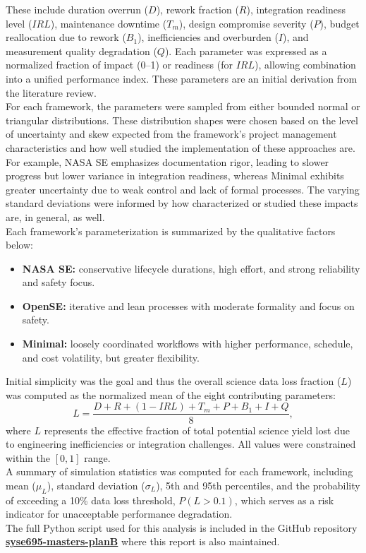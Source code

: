 These include duration overrun ($D$), rework fraction ($R$), integration readiness level ($IRL$), maintenance downtime ($T_m$), design compromise severity ($P$), budget reallocation due to rework ($B_1$), inefficiencies and overburden ($I$), and measurement quality degradation ($Q$). 
Each parameter was expressed as a normalized fraction of impact (0–1) or readiness (for $IRL$), allowing combination into a unified performance index.
These parameters are an initial derivation from the literature review.\\
For each framework, the parameters were sampled from either bounded normal or triangular distributions. 
These distribution shapes were chosen based on the level of uncertainty and skew expected from the framework’s project management characteristics and how well studied the implementation of these approaches are. 
For example, NASA SE emphasizes documentation rigor, leading to slower progress but lower variance in integration readiness, whereas Minimal exhibits greater uncertainty due to weak control and lack of formal processes. The varying standard deviations were informed by how characterized or studied these impacts are, in general, as well.\\
Each framework’s parameterization is summarized by the qualitative factors below:
\begin{itemize}[noitemsep, topsep=0pt]
    \item \textbf{NASA SE:} conservative lifecycle durations, high effort, and strong reliability and safety focus. 
    \item \textbf{OpenSE:} iterative and lean processes with moderate formality and focus on safety.
    \item \textbf{Minimal:} loosely coordinated workflows with higher performance, schedule, and cost volatility, but greater flexibility.
\end{itemize}

Initial simplicity was the goal and thus the overall science data loss fraction ($L$) was computed as the normalized mean of the eight contributing parameters:
\begin{equation}
    L = \frac{D + R + (1 - IRL) + T_m + P + B_1 + I + Q}{8},
\end{equation}
where $L$ represents the effective fraction of total potential science yield lost due to engineering inefficiencies or integration challenges. All values were constrained within the $[0, 1]$ range.\\
A summary of simulation statistics was computed for each framework, including mean ($\mu_L$), standard deviation ($\sigma_L$), 5th and 95th percentiles, and the probability of exceeding a 10\% data loss threshold, $P(L > 0.1)$, which serves as a risk indicator for unacceptable performance degradation.\\

\vspace{1em}
\noindent The full Python script used for this analysis is included in the GitHub repository \href{https://github.com/hannahmclaurin/syse695-masters-planB}{\textbf{syse695-masters-planB}} where this report is also maintained.